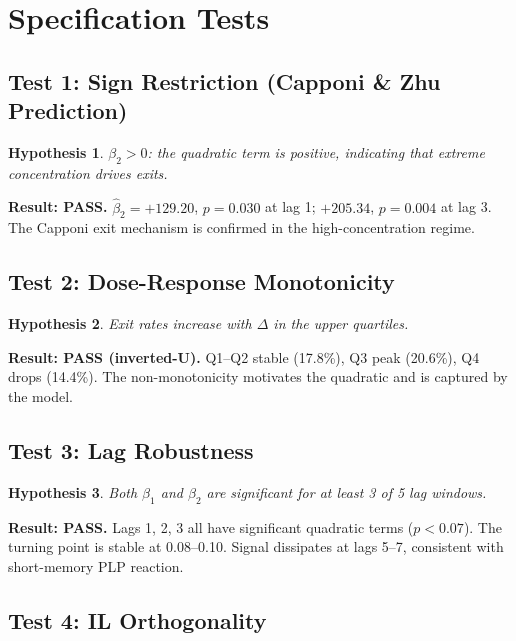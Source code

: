 \documentclass[11pt,a4paper]{article}
\newtheorem{hypothesis}{Hypothesis}
\begin{document}
\section{Specification Tests}\label{sec:spec-tests}

\subsection{Test 1: Sign Restriction (Capponi \& Zhu Prediction)}

\begin{hypothesis}
$\beta_2 > 0$: the quadratic term is positive, indicating that extreme
concentration drives exits.
\end{hypothesis}

\textbf{Result: PASS.} $\hat\beta_2 = +129.20$, $p = 0.030$ at lag 1;
$+205.34$, $p = 0.004$ at lag 3. The Capponi exit mechanism is confirmed
in the high-concentration regime.

\subsection{Test 2: Dose-Response Monotonicity}

\begin{hypothesis}
Exit rates increase with $\Delta$ in the upper quartiles.
\end{hypothesis}

\textbf{Result: PASS (inverted-U).} Q1--Q2 stable (17.8\%), Q3 peak
(20.6\%), Q4 drops (14.4\%). The non-monotonicity motivates the quadratic
and is captured by the model.

\subsection{Test 3: Lag Robustness}

\begin{hypothesis}
Both $\beta_1$ and $\beta_2$ are significant for at least 3 of 5 lag
windows.
\end{hypothesis}

\textbf{Result: PASS.} Lags 1, 2, 3 all have significant quadratic terms
($p < 0.07$). The turning point is stable at 0.08--0.10. Signal dissipates
at lags 5--7, consistent with short-memory PLP reaction.

\subsection{Test 4: IL Orthogonality}
\end{document}
